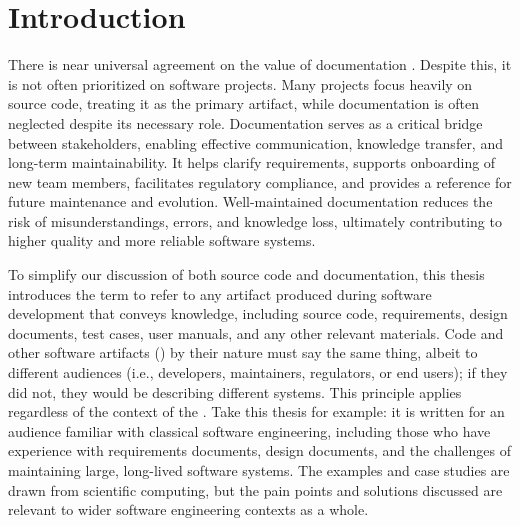 \chapter{Introduction}

There is near universal agreement on the value of documentation 
\citep{AckroydEtAl2008, AlMatiiAndBoujarwah2002, CarverEtAl2007,
EasterbrookAndJohns2009, FlattEtAl2009, FritzsonGunnarssonAndJirstrand2002, 
HattonAndRoberts1994, Hyman1990, JohnsonAndJohnson1997, Kelly2007, Kelly2013, 
Kelly2015, Knuth1984, Kotula2000, Leisch2002, Lenth2009, LenthEtAl2007, 
MatthewsEtAl2008, Parnas2010, ParnasAndClements1986, ParnasEtAl1994, 
PieterseKourieAndBoake2004, Ramsey1994, Roache1998, SandersAndKelly2008, 
SchulteEtAl2012, ShumAndCook1993, Simonis2003, SmithAndKoothoor2016, 
SmithAndYu2009, SmithEtAl2015-SS-TR, SmithKoothoorAndNedialkov2014,
Thimbleby1986}. Despite this, it is not often
prioritized on software projects. Many projects focus heavily on source code, 
treating it as the primary artifact, while documentation is often neglected 
despite its necessary role. Documentation serves as a critical bridge between 
stakeholders, enabling effective communication, knowledge transfer, and 
long-term maintainability. It helps clarify requirements, supports onboarding 
of new team members, facilitates regulatory compliance, and provides a 
reference for future maintenance and evolution. Well-maintained documentation 
reduces the risk of misunderstandings, errors, and knowledge loss, ultimately 
contributing to higher quality and more reliable software systems. 

To simplify our discussion of both source code and documentation, this thesis 
introduces the term \sf{} to refer to any artifact produced during software 
development that conveys knowledge, including source code, 
requirements, design documents, test cases, user manuals, and any other 
relevant materials. Code and other software artifacts (\sfs{}) by their nature 
must say the same thing, albeit to different audiences (i.e., developers,
maintainers, regulators, or end users); if they did not, they would be 
describing different systems. This principle applies regardless of the context 
of the \sf{}. Take this thesis for example: it is written 
for an audience familiar with classical software engineering, including those 
who have experience with requirements documents, design documents, and the 
challenges of maintaining large, long-lived software systems. The examples and 
case studies are drawn from scientific computing, but the pain points and 
solutions discussed are relevant to wider software engineering contexts as a 
whole.

